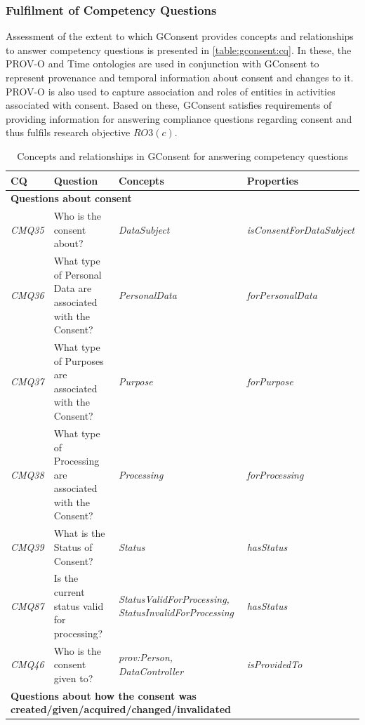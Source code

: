 \subsubsection{Fulfilment of Competency Questions}
Assessment of the extent to which GConsent provides concepts and relationships to answer competency questions is presented in \autoref{table:gconsent:cq}. 
In these, the PROV-O and Time ontologies are used in conjunction with GConsent to represent provenance and temporal information about consent and changes to it.
PROV-O is also used to capture association and roles of entities in activities associated with consent.
Based on these, GConsent satisfies requirements of providing information for answering compliance questions regarding consent and thus fulfils research objective $RO3(c)$.
\begin{table}[htbp]
\footnotesize
\centering
{}
\begin{tabularx}{\textwidth}{|p{1cm}|X|p{4cm}|p{3.5cm}|}
\caption{Concepts and relationships in GConsent for answering competency questions} \\ \hline
\label{table:gconsent:cq}
\textbf{CQ} & \textbf{Question} & \textbf{Concepts} & \textbf{Properties} \\ \hline
\multicolumn{4}{|l|}{\textbf{Questions about consent}} \\ \hline
\textit{CMQ35} & Who is the consent about? & \textit{DataSubject} & \textit{isConsentForDataSubject} \\ \hline
\textit{CMQ36} & What type of Personal Data are associated with the Consent? & \textit{PersonalData} & \textit{forPersonalData} \\ \hline
\textit{CMQ37} & What type of Purposes are associated with the Consent? & \textit{Purpose} & \textit{forPurpose} \\ \hline
\textit{CMQ38} & What type of Processing are associated with the Consent? & \textit{Processing} & \textit{forProcessing} \\ \hline
\textit{CMQ39} & What is the Status of Consent? & \textit{Status} & \textit{hasStatus} \\ \hline
\textit{CMQ87} & Is the current status valid for processing? & \textit{StatusValidForProcessing, StatusInvalidForProcessing} & \textit{hasStatus} \\ \hline
\textit{CMQ46} & Who is the consent given to? & \textit{prov:Person, DataController} & \textit{isProvidedTo} \\ \hline
\multicolumn{4}{|l|}{\textbf{Questions about how the consent was created/given/acquired/changed/invalidated}} \\ \hline

\end{tabularx}
\end{table}
